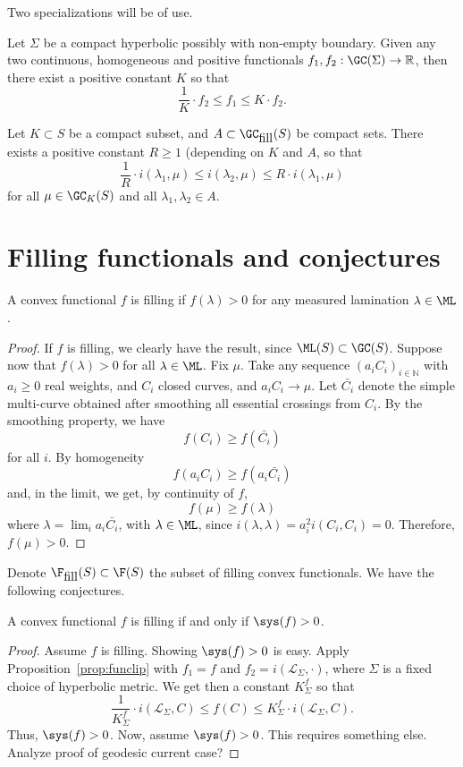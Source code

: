Two specializations will be of use.

\begin{corollary}
Let $\Sigma$ be a compact hyperbolic possibly with non-empty boundary.
Given any two continuous, homogeneous and positive functionals $f_1,f_2 : \GC(\Sigma) \to \mathbb{R}$, then
there exist a positive constant $K$ so that
\[
   \frac{1}{K}\cdot f_2 \leq f_1 \leq K \cdot f_2.
\]
\label{prop:funclip}
\end{corollary}

\begin{corollary}
 Let $K \subset S$ be a compact subset, and $A \subset \GC_{\mbox{fill}}(S)$ be compact sets. There exists a positive constant $R \geq 1$ (depending on $K$ and $A$, so that
 \[
    \frac{1}{R} \cdot  i(\lambda_1,\mu) \leq i(\lambda_2,\mu) \leq R \cdot i(\lambda_1,\mu)
 \]
 for all $\mu \in \GC_K(S)$ and all $\lambda_1,\lambda_2 \in A$.
\end{corollary}

\section{Filling functionals and conjectures}

\begin{lemma}
A convex functional $f$ is filling if $f(\lambda) > 0$ for any measured lamination $\lambda \in \ML$.
\end{lemma}
\begin{proof}
If $f$ is filling, we clearly have the result, since $\ML(S)\subset \GC(S)$.
Suppose now that $f(\lambda)>0$ for all $\lambda \in \ML$.
Fix $\mu$. Take any sequence $(a_i C_i)_{i \in \mathbb{N}}$ with $a_i \geq 0$ real weights, and $C_i$ closed curves, and $a_i C_i \to \mu$. Let $\bar{C_i}$ denote the simple multi-curve obtained after smoothing all essential crossings from $C_i$.
By the smoothing property, we have
\[
  f(C_i) \geq f(\bar{C_i})
\]
for all $i$.
By homogeneity
\[
  f(a_iC_i) \geq f(a_i\bar{C_i})
\]
and, in the limit, we get, by continuity of $f$,
\[
  f(\mu) \geq f(\lambda)
\]
where $\lambda = \lim_i a_i\bar{C_i}$, with $\lambda \in \ML$, since $i(\lambda,\lambda)=a_i^2i(C_i,C_i)=0$.
Therefore, $f(\mu) >0$.
\end{proof}



Denote $\F_{\mbox{fill}}(S) \subset \F(S)$ the subset of filling convex functionals.
We have the following conjectures.

\begin{conjecture}
A convex functional $f$ is filling if and only if
$\sys(f)>0$.
\label{conj:filling_systole}
\end{conjecture}
\begin{proof}
Assume $f$ is filling. Showing $\sys(f)>0$ is easy.
Apply Proposition~\ref{prop:funclip} with $f_1=f$ and $f_2=i(\mathcal{L}_{\Sigma},\cdot)$, where $\Sigma$ is a fixed choice of hyperbolic metric. We get then a constant $K^f_{\Sigma}$ so that
\[
  \frac{1}{K^f_{\Sigma}}\cdot i(\mathcal{L}_{\Sigma},C) \leq f(C) \leq K^f_{\Sigma}\cdot i(\mathcal{L}_{\Sigma},C).
\]
Thus, $\sys(f)>0$.
Now, assume $\sys(f)>0$. This requires something else. Analyze proof of geodesic current case?
\end{proof}

